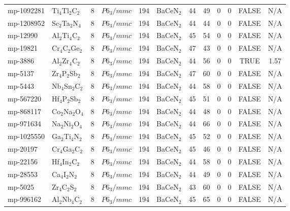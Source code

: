 {\begin{longtable}{llcccccccccc}
    mp-1092281 & Ti$_{4}$Tl$_{2}$C$_{2}$ & 8     & $P6_3/mmc$ & 194   & BaCeN$_{2}$ & 44    & 49    & 0     & 0     & FALSE & N/A \\
    mp-1208952 & Sc$_{2}$Ta$_{2}$N$_{4}$ & 8     & $P6_3/mmc$ & 194   & BaCeN$_{2}$ & 44    & 44    & 0     & 0     & FALSE & N/A \\
    mp-12990 & Al$_{2}$Ti$_{4}$C$_{2}$ & 8     & $P6_3/mmc$ & 194   & BaCeN$_{2}$ & 45    & 54    & 0     & 0     & FALSE & N/A \\
    mp-19821 & Cr$_{4}$C$_{2}$Ge$_{2}$ & 8     & $P6_3/mmc$ & 194   & BaCeN$_{2}$ & 47    & 43    & 0     & 0     & FALSE & N/A \\
    mp-3886 & Al$_{2}$Zr$_{4}$C$_{2}$ & 8     & $P6_3/mmc$ & 194   & BaCeN$_{2}$ & 44    & 56    & 0     & 0     & TRUE  & 1.57  \\
    mp-5137 & Zr$_{4}$P$_{2}$Sb$_{2}$ & 8     & $P6_3/mmc$ & 194   & BaCeN$_{2}$ & 47    & 60    & 0     & 0     & FALSE & N/A \\
    mp-5443 & Nb$_{4}$Sn$_{2}$C$_{2}$ & 8     & $P6_3/mmc$ & 194   & BaCeN$_{2}$ & 44    & 58    & 0     & 0     & FALSE & N/A \\
    mp-567220 & Hf$_{4}$P$_{2}$Sb$_{2}$ & 8     & $P6_3/mmc$ & 194   & BaCeN$_{2}$ & 45    & 51    & 0     & 0     & FALSE & N/A \\
    mp-868117 & Co$_{2}$Na$_{2}$O$_{4}$ & 8     & $P6_3/mmc$ & 194   & BaCeN$_{2}$ & 44    & 48    & 0     & 0     & FALSE & N/A \\
    mp-971634 & Na$_{2}$Ni$_{2}$O$_{4}$ & 8     & $P6_3/mmc$ & 194   & BaCeN$_{2}$ & 44    & 66    & 0     & 0     & FALSE & N/A \\
    mp-1025550 & Ga$_{2}$Ti$_{4}$N$_{2}$ & 8     & $P6_3/mmc$ & 194   & BaCeN$_{2}$ & 45    & 52    & 0     & 0     & FALSE & N/A \\
    mp-20197 & Cr$_{4}$Ga$_{2}$C$_{2}$ & 8     & $P6_3/mmc$ & 194   & BaCeN$_{2}$ & 45    & 46    & 0     & 0     & FALSE & N/A \\
    mp-22156 & Hf$_{4}$In$_{2}$C$_{2}$ & 8     & $P6_3/mmc$ & 194   & BaCeN$_{2}$ & 44    & 58    & 0     & 0     & FALSE & N/A \\
    mp-28553 & Ca$_{4}$I$_{2}$N$_{2}$ & 8     & $P6_3/mmc$ & 194   & BaCeN$_{2}$ & 44    & 49    & 0     & 0     & FALSE & N/A \\
    mp-5025 & Zr$_{4}$C$_{2}$S$_{2}$ & 8     & $P6_3/mmc$ & 194   & BaCeN$_{2}$ & 43    & 60    & 0     & 0     & FALSE & N/A \\
    mp-996162 & Al$_{2}$Nb$_{4}$C$_{2}$ & 8     & $P6_3/mmc$ & 194   & BaCeN$_{2}$ & 45    & 65    & 0     & 0     & FALSE & N/A \\

\end{longtable}}
